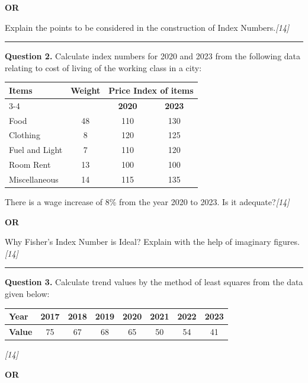 \documentclass[11pt,a4paper]{article}
\newcommand{\pts}[1]{\hfill   \textit{[#1]}}
\begin{document}
\centerline{   \textbf{OR}}

Explain the points to be considered in the construction of Index Numbers.\pts{14}

\medskip\rule{\linewidth}{0.2pt}




\noindent   \textbf{Question 2.}
Calculate index numbers for 2020 and 2023 from the following data relating to cost of living of the working class in a city:


\begin{center}
\small

\begin{tabular}{|l|c|c|c|}
\hline
   \textbf{Items} &   \textbf{Weight} & \multicolumn{2}{c|}{   \textbf{Price Index of items}} \\
\cline{3-4}
& &   \textbf{2020} &   \textbf{2023} \\
\hline
Food & 48 & 110 & 130 \\
Clothing & 8 & 120 & 125 \\
Fuel and Light & 7 & 110 & 120 \\
Room Rent & 13 & 100 & 100 \\
Miscellaneous & 14 & 115 & 135 \\
\hline
\end{tabular}
\end{center}

There is a wage increase of 8\% from the year 2020 to 2023. Is it adequate?\pts{14}

\centerline{   \textbf{OR}}

Why Fisher's Index Number is Ideal? Explain with the help of imaginary figures.\pts{14}

\medskip\rule{\linewidth}{0.2pt}




\noindent   \textbf{Question 3.}
Calculate trend values by the method of least squares from the data given below:


\begin{center}
\small

\begin{tabular}{|l|c|c|c|c|c|c|c|}
\hline
   \textbf{Year} & 2017 & 2018 & 2019 & 2020 & 2021 & 2022 & 2023 \\
\hline
   \textbf{Value} & 75 & 67 & 68 & 65 & 50 & 54 & 41 \\
\hline
\end{tabular}
\end{center}\pts{14}

\centerline{   \textbf{OR}}
\end{document}
